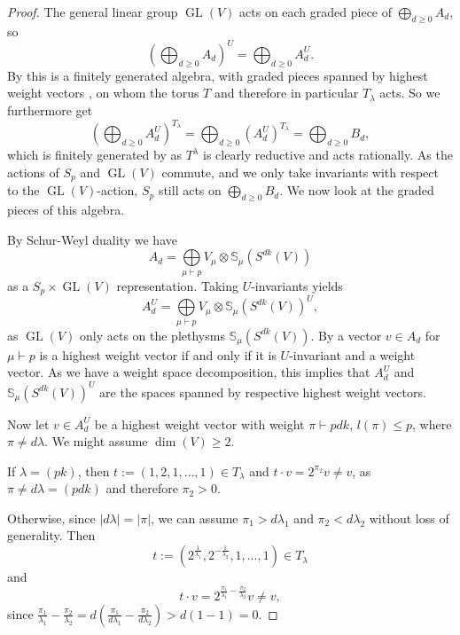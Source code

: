 \documentclass[a4paper]{amsart}
\DeclareMathOperator{\GL}{\mathrm{GL}}
\newcommand{\abs}[1]{\left| #1\right|}
\begin{document}
\begin{proof}
	The general linear group $\GL(V)$ acts on each graded piece of $\bigoplus_{d\geq0}A_d$, so
	\begin{displaymath}
		\left(\bigoplus_{d\geq0}A_d\right)^U=
		\bigoplus_{d\geq0}A_d^U.
	\end{displaymath}
	By {\cite[Thm. 9.4]{Gro97}} this is a finitely generated algebra,
	with graded pieces spanned by highest weight vectors \cite[p. 115]{Fu97},
	on whom the torus $T$ and therefore in particular $T_\lambda$ acts.
	So we furthermore get
	\begin{displaymath}
		\left(\bigoplus_{d\geq0}A_d^U\right)^{T_\lambda}=
		\bigoplus_{d\geq0}(A_d^U)^{T_\lambda}=\bigoplus_{d\geq0}B_d,
	\end{displaymath}
	which is finitely generated by \cite[Thm. A]{Gro97} as $T^\lambda$ is clearly reductive and acts rationally.
	As the actions of $S_p$ and $\GL(V)$ commute, and we only take invariants with respect to the $\GL(V)$-action,
	$S_p$ still acts on $\bigoplus_{d\geq0}B_d$.
	We now look at the graded pieces of this algebra.
	
	By Schur-Weyl duality we have
	\begin{displaymath}
		A_d=\bigoplus\limits_{\mu\vdash p}V_\mu\otimes\mathbb{S}_\mu(S^{dk}(V))
	\end{displaymath}
	as a $S_p\times\GL(V)$ representation.
	Taking $U$-invariants yields
	\begin{displaymath}
		A_d^U=\bigoplus\limits_{\mu\vdash p}V_\mu\otimes\mathbb{S}_\mu(S^{dk}(V))^U,
	\end{displaymath}
	as $\GL(V)$ only acts on the plethysms $\mathbb{S}_\mu(S^{dk}(V))$.
	By \cite[p. 115]{Fu97} a vector $v\in A_d$ for $\mu\vdash p$ is a highest weight vector if and only if it is $U$-invariant and a weight vector.
	As we have a weight space decomposition,
	this implies that $A_d^U$ and $\mathbb{S}_\mu(S^{dk}(V))^U$ are the spaces spanned by respective highest weight vectors.
	
	Now let $v\in A_d^U$ be a highest weight vector with weight $\pi\vdash pdk$, $l(\pi)\leq p$,
	where $\pi\neq d\lambda$.
	We might assume $\dim(V)\geq 2$.
	
	If $\lambda=(pk)$, then $t:=(1,2,1,\ldots,1)\in T_\lambda$ and $t\cdot v=2^{\pi_2}v\neq v$, as $\pi\neq d\lambda=(pdk)$ and therefore $\pi_2>0$.
	
	Otherwise, since $\abs{d\lambda}=\abs{\pi}$,
	we can assume $\pi_1>d\lambda_1$ and $\pi_2<d\lambda_2$ without loss of generality.
	Then 
	\begin{displaymath}
		t:=(2^{\frac{1}{\lambda_1}},2^{-\frac{1}{\lambda_2}},1,\ldots,1)\in T_\lambda
	\end{displaymath}
	and
	\begin{displaymath}
		t\cdot v=2^{\frac{\pi_1}{\lambda_1}-\frac{\pi_2}{\lambda_2}}v\neq v,
	\end{displaymath}
	since $\frac{\pi_1}{\lambda_1}-\frac{\pi_2}{\lambda_2}=d\left(\frac{\pi_1}{d\lambda_1}-\frac{\pi_2}{d\lambda_2}\right)>d(1-1)=0$.
	

\end{proof}
\end{document}

